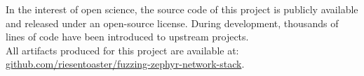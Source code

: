 \documentclass{article}
\begin{document}
\vspace{70px}
\begin{center}
    \begin{minipage}{0.68\textwidth}
        \centering
        In the interest of open science, the source code of this project is publicly available and released under an open-source license. During development, thousands of lines of code have been introduced to upstream projects.\\All artifacts produced for this project are available at:\\\vspace{8px}\href{https://github.com/riesentoaster/fuzzing-zephyr-network-stack}{github.com/riesentoaster/fuzzing-zephyr-network-stack}.
    \end{minipage}
\end{center}

\vspace{50px}

\end{document}
